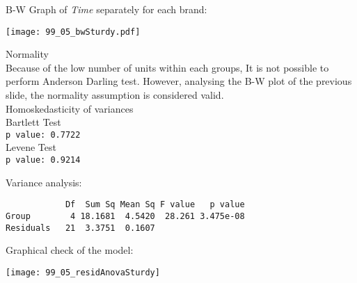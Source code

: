 \begin{frame}
  B-W Graph of \textit{Time} separately for each brand:\\
  \vspace{-0.5cm}
  \begin{center}
    \texttt{[image: 99\_05\_bwSturdy.pdf]}
  \end{center}
\end{frame}

\begin{frame}
  Normality\\
  \vspace*{0.25cm}
  Because of the low number of units within each groups, It is not possible to perform Anderson Darling test. However, analysing the B-W plot of the previous slide, the normality assumption is considered valid. \\ 
  \vspace{1cm}
  Homoskedasticity of variances\\
  \vspace*{0.25cm}
  Bartlett Test\\
  \texttt{p value: 0.7722}\\
  \vspace*{0.75cm}
  Levene Test\\
  \texttt{p value: 0.9214}\\
\end{frame}

\begin{frame}[fragile]
  \vspace{0.25cm}
  Variance analysis:
  \begin{verbatim}
            Df  Sum Sq Mean Sq F value   p value    
Group        4 18.1681  4.5420  28.261 3.475e-08
Residuals   21  3.3751  0.1607       
  \end{verbatim}
\end{frame}

\begin{frame}
  Graphical check of the model:\\
  \vspace{.1cm}
  \begin{center}
    \texttt{[image: 99\_05\_residAnovaSturdy]}
    \end{center}
\end{frame}


